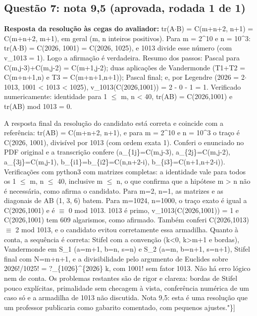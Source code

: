 \documentclass{article}%
\begin{document}
\subsection*{Questão 7: nota 9,5 (aprovada, rodada 1 de 1)}%
\textbf{Resposta da resolução às cegas do avaliador:} tr(A$\cdot$B) = C(m+n+2, n+1) = C(m+n+2, m+1), em geral (m, n inteiros positivos).\newline%
\newline%
Para m = 2\^{}10 e n = 10\^{}3: tr(A$\cdot$B) = C(2026, 1001) = C(2026, 1025), e 1013 divide esse número (com v\_1013 = 1). Logo a afirmação é verdadeira.\newline%
\newline%
Resumo dos passos: Pascal para C(m,j-3)+C(m,j-2) = C(m+1,j-2); duas aplicações de Vandermonde (T1+T2 = C(m+n+1,n) e T3 = C(m+n+1,n+1)); Pascal final; e, por Legendre (2026 = 2$\cdot$1013, 1001 < 1013 < 1025), v\_1013(C(2026,1001)) = 2 - 0 - 1 = 1.\newline%
\newline%
Verificado numericamente: identidade para 1 $\leq$ m, n < 40, tr(AB) = C(2026,1001) e tr(AB) mod 1013 = 0.\par %
A resposta final da resolução do candidato está correta e coincide com a referência: tr(AB) = C(m+n+2, n+1), e para m = 2\^{}10 e n = 10\^{}3 o traço é C(2026, 1001), divisível por 1013 (com ordem exata 1). Conferi o enunciado no PDF original e a transcrição confere (a\_\{1j\}=C(m,j-3), a\_\{2j\}=C(m,j-2), a\_\{3j\}=C(m,j-1), b\_\{i1\}=b\_\{i2\}=C(n,n+2-i), b\_\{i3\}=C(n+1,n+2-i)). Verificações com python3 com matrizes completas: a identidade vale para todos os 1 $\leq$ m, n $\leq$ 40, inclusive m $\leq$ n, o que confirma que a hipótese m > n não é necessária, como afirma o candidato. Para m=2, n=1, as matrizes e as diagonais de AB (1, 3, 6) batem. Para m=1024, n=1000, o traço exato é igual a C(2026,1001) e é $\equiv$ 0 mod 1013. 1013 é primo, v\_1013(C(2026,1001)) = 1 e C(2026,1001) tem 609 algarismos, como afirmado. Também conferi C(2026,1013) $\equiv$ 2 mod 1013, e o candidato evitou corretamente essa armadilha. Quanto à conta, a sequência é correta: Stifel com a convenção (k<0, k>m+1 e bordas), Vandermonde em S\_1 (a=m+1, b=n, s=n) e S\_2 (a=m, b=n+1, s=n+1), Stifel final com N=m+n+1, e a divisibilidade pelo argumento de Euclides sobre 2026!/1025! = ?\_\{1026\}\^{}\{2026\} k, com 1001! sem fator 1013. Não há erro lógico nem de conta. Os problemas restantes são de rigor e clareza: bordas de Stifel pouco explícitas, primalidade sem checagem à vista, conferência numérica de um caso só e a armadilha de 1013 não discutida. Nota 9,5: esta é uma resolução que um professor publicaria como gabarito comentado, com pequenos ajustes."\}{]}%
\end{document}
